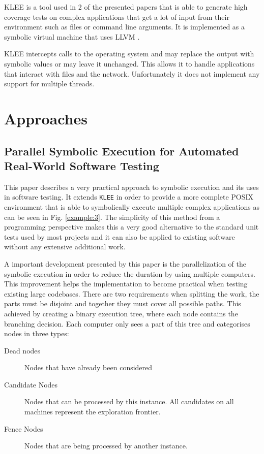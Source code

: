 \documentclass[10pt]{llncs}
\begin{document}
KLEE \cite{klee} is a tool used in 2 of the presented papers that is able to generate high coverage tests on complex applications that get a lot of input from their environment such as files or command line arguments. It is implemented as a symbolic virtual machine that uses LLVM \cite{llvm}.

KLEE intercepts calls to the operating system and may replace the output with symbolic values or may leave it unchanged. This allows it to handle applications that interact with files and the network. Unfortunately it does not implement any support for multiple threads. 

\section{Approaches}
\label{approaches}

\subsection{Parallel Symbolic Execution for Automated Real-World Software Testing \cite{base3}}
\label{approach1}

This paper describes a very practical approach to symbolic execution and its uses in software testing. It extends \texttt{KLEE} \cite{klee} in order to provide a more complete POSIX environment that is able to symbolically execute multiple complex applications as can be seen in Fig. \ref{example:3}. The simplicity of this method from a programming perspective makes this a very good alternative to the standard unit tests used by most projects and it can also be applied to existing software without any extensive additional work.

A important development presented by this paper is the parallelization of the symbolic execution in order to reduce the duration by using multiple computers. This improvement helps the implementation to become practical when testing existing large codebases. There are two requirements when splitting the work, the parts must be disjoint and together they must cover all possible paths. This achieved by creating a binary execution tree, where each node contains the branching decision. Each computer only sees a part of this tree and categorises nodes in three types:

\begin{description}
	\item[Dead nodes] Nodes that have already been considered
	\item[Candidate Nodes] Nodes that can be processed by this instance. All candidates on all machines represent the exploration frontier.
	\item[Fence Nodes] Nodes that are being processed by another instance.
\end{description}
\end{document}

